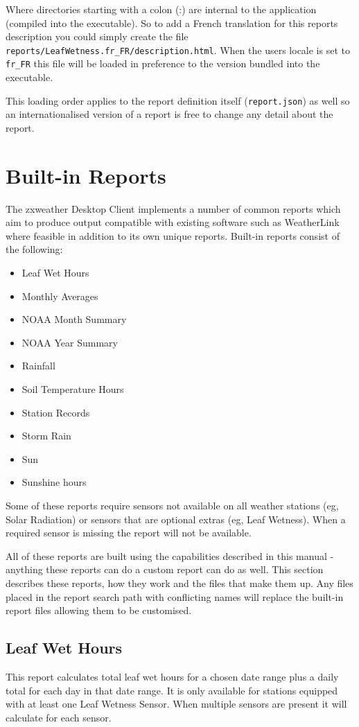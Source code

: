 \documentclass[a4paper,10pt]{book}
\begin{document}
Where directories starting with a colon (:) are internal to the application (compiled into the executable). So to add a French translation for this reports description you could simply create the file \verb|reports/LeafWetness.fr_FR/description.html|. When the users locale is set to \verb|fr_FR| this file will be loaded in preference to the version bundled into the executable.

This loading order applies to the report definition itself (\verb|report.json|) as well so an internationalised version of a report is free to change any detail about the report.

\chapter{Built-in Reports}
\label{app_built_in_reports}
The zxweather Desktop Client implements a number of common reports which aim to produce output compatible with existing software such as WeatherLink where feasible in addition to its own unique reports. Built-in reports consist of the following:
\begin{itemize}
\item Leaf Wet Hours
\item Monthly Averages
\item NOAA Month Summary
\item NOAA Year Summary
\item Rainfall
\item Soil Temperature Hours
\item Station Records
\item Storm Rain
\item Sun
\item Sunshine hours
\end{itemize}

Some of these reports require sensors not available on all weather stations (eg, Solar Radiation) or sensors that are optional extras (eg, Leaf Wetness). When a required sensor is missing the report will not be available.

All of these reports are built using the capabilities described in this manual - anything these reports can do a custom report can do as well. This section describes these reports, how they work and the files that make them up. Any files placed in the report search path with conflicting names will replace the built-in report files allowing them to be customised.

\section{Leaf Wet Hours}
This report calculates total leaf wet hours for a chosen date range plus a daily total for each day in that date range. It is only available for stations equipped with at least one Leaf Wetness Sensor. When multiple sensors are present it will calculate for each sensor.
\end{document}
